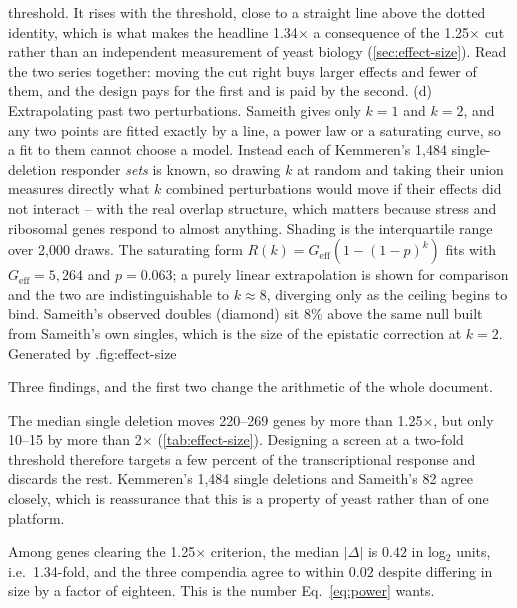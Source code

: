 {  threshold. It rises with the threshold, close to a straight line above the
  dotted identity, which is what makes the headline 1.34$\times$ a consequence of
  the 1.25$\times$ cut rather than an independent measurement of yeast biology
  (\cref{sec:effect-size}). Read the two series together: moving the cut right
  buys larger effects and fewer of them, and the design pays for the first and is
  paid by the second. (d) Extrapolating
  past two perturbations. Sameith gives only $k=1$ and $k=2$, and any two points
  are fitted exactly by a line, a power law or a saturating curve, so a fit to
  them cannot choose a model. Instead each of Kemmeren's 1{,}484 single-deletion
  responder \emph{sets} is known, so drawing $k$ at random and taking their union
  measures directly what $k$ combined perturbations would move if their effects
  did not interact -- with the real overlap structure, which matters because
  stress and ribosomal genes respond to almost anything. Shading is the
  interquartile range over 2{,}000 draws. The saturating form
  $R(k)=G_{\mathrm{eff}}(1-(1-p)^{k})$ fits with $G_{\mathrm{eff}}=5{,}264$ and
  $p=0.063$; a purely linear extrapolation is shown for comparison and the two
  are indistinguishable to $k\approx8$, diverging only as the ceiling begins to
  bind. Sameith's observed doubles (diamond) sit $8\%$ above the same null built
  from Sameith's own singles, which is the size of the epistatic correction at
  $k=2$. Generated by
  .}{fig:effect-size}

Three findings, and the first two change the arithmetic of the whole document.

The median single deletion moves 220--269 genes by more than 1.25$\times$, but
only 10--15 by more than 2$\times$ (\cref{tab:effect-size}). Designing a screen at
a two-fold threshold therefore targets a few percent of the transcriptional
response and discards the rest. Kemmeren's 1{,}484 single deletions and Sameith's
82 agree closely, which is reassurance that this is a property of yeast rather
than of one platform.

 Among genes clearing the 1.25$\times$ criterion, the median $|\Delta|$
is $0.42$ in log$_2$ units, i.e.\ 1.34-fold, and the three compendia agree to
within $0.02$ despite differing in size by a factor of eighteen. This is the
number Eq.~\ref{eq:power} wants.


